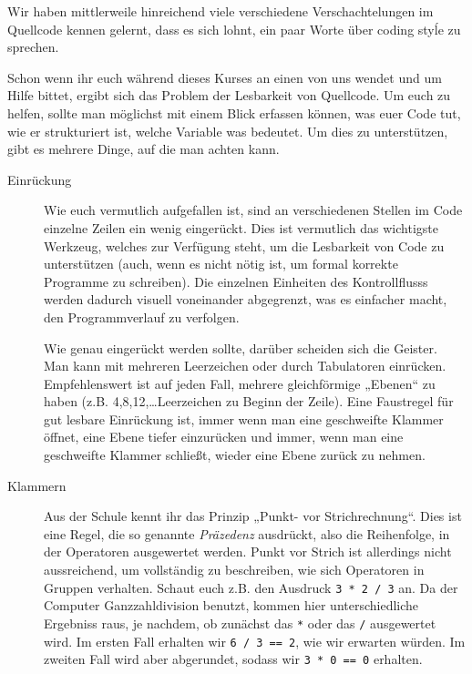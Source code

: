 
Wir haben mittlerweile hinreichend viele verschiedene Verschachtelungen im
Quellcode kennen gelernt, dass es sich lohnt, ein paar Worte über coding styĺe
zu sprechen.

Schon wenn ihr euch während dieses Kurses an einen von uns wendet und um Hilfe
bittet, ergibt sich das Problem der Lesbarkeit von Quellcode. Um euch zu
helfen, sollte man möglichst mit einem Blick erfassen können, was euer Code
tut, wie er strukturiert ist, welche Variable was bedeutet. Um dies zu
unterstützen, gibt es mehrere Dinge, auf die man achten kann.

\begin{description}
    \item[Einrückung]
        Wie euch vermutlich aufgefallen ist, sind an verschiedenen Stellen im
        Code einzelne Zeilen ein wenig eingerückt. Dies ist vermutlich das
        wichtigste Werkzeug, welches zur Verfügung steht, um die Lesbarkeit von
        Code zu unterstützen (auch, wenn es nicht nötig ist, um formal korrekte
        Programme zu schreiben). Die einzelnen Einheiten des Kontrollflusss
        werden dadurch visuell voneinander abgegrenzt, was es einfacher macht,
        den Programmverlauf zu verfolgen.

        Wie genau eingerückt werden sollte, darüber scheiden sich die Geister.
        Man kann mit mehreren Leerzeichen oder durch Tabulatoren einrücken.
        Empfehlenswert ist auf jeden Fall, mehrere gleichförmige „Ebenen“ zu
        haben (z.B. 4,8,12,\dots Leerzeichen zu Beginn der Zeile). Eine
        Faustregel für gut lesbare Einrückung ist, immer wenn man eine
        geschweifte Klammer öffnet, eine Ebene tiefer einzurücken und immer,
        wenn man eine geschweifte Klammer schließt, wieder eine Ebene zurück zu
        nehmen.
    \item[Klammern]
        Aus der Schule kennt ihr das Prinzip „Punkt- vor Strichrechnung“. Dies
        ist eine Regel, die so genannte \emph{Präzedenz} ausdrückt, also die
        Reihenfolge, in der Operatoren ausgewertet werden. Punkt vor Strich ist
        allerdings nicht aussreichend, um vollständig zu beschreiben, wie sich
        Operatoren in Gruppen verhalten. Schaut euch z.B. den Ausdruck
        \texttt{3 * 2 / 3} an. Da der Computer Ganzzahldivision benutzt, kommen
        hier unterschiedliche Ergebniss raus, je nachdem, ob zunächst das
        \texttt{*} oder das \texttt{/} ausgewertet wird. Im ersten Fall
        erhalten wir \texttt{6 / 3 == 2}, wie wir erwarten würden. Im zweiten
        Fall wird aber abgerundet, sodass wir \texttt{3 * 0 == 0} erhalten.


\end{description}
